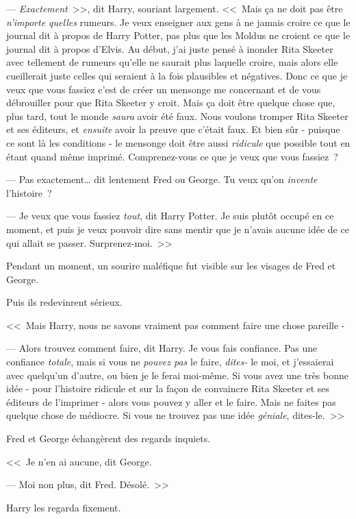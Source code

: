 --- \emph{Exactement}~>>, dit Harry, souriant largement. <<~Mais ça ne doit pas être \emph{n'importe quelles} rumeurs. Je veux enseigner aux gens à ne jamais croire ce que le journal dit à propos de Harry Potter, pas plus que les Moldus ne croient ce que le journal dit à propos d'Elvis. Au début, j'ai juste pensé à inonder Rita Skeeter avec tellement de rumeurs qu'elle ne saurait plus laquelle croire, mais alors elle cueillerait juste celles qui seraient à la fois plausibles et négatives. Donc ce que je veux que vous fassiez c'est de créer un mensonge me concernant et de vous débrouiller pour que Rita Skeeter y croit. Mais ça doit être quelque chose que, plus tard, tout le monde \emph{saura} avoir été faux. Nous voulons tromper Rita Skeeter et ses éditeurs, et \emph{ensuite} avoir la preuve que c'était faux. Et bien sûr - puisque ce sont là les conditions - le mensonge doit être aussi \emph{ridicule} que possible tout en étant quand même imprimé. Comprenez-vous ce que je veux que vous fassiez~?

--- Pas exactement… dit lentement Fred ou George. Tu veux qu'on \emph{invente} l'histoire~?

--- Je veux que vous fassiez \emph{tout}, dit Harry Potter. Je suis plutôt occupé en ce moment, et puis je veux pouvoir dire sans mentir que je n'avais aucune idée de ce qui allait se passer. Surprenez-moi.~>>

Pendant un moment, un sourire maléfique fut visible sur les visages de Fred et George.

Puis ils redevinrent sérieux.

<<~Mais Harry, nous ne savons vraiment pas comment faire une chose pareille -

--- Alors trouvez comment faire, dit Harry. Je vous fais confiance. Pas une confiance \emph{totale}, mais si vous ne \emph{pouvez pas} le faire, \emph{dites-} le moi, et j'essaierai avec quelqu'un d'autre, ou bien je le ferai moi-même. Si vous avez une très bonne idée - pour l'histoire ridicule et sur la façon de convaincre Rita Skeeter et ses éditeurs de l'imprimer - alors vous pouvez y aller et le faire. Mais ne faites pas quelque chose de médiocre. Si vous ne trouvez pas une idée \emph{géniale}, dites-le.~>>

Fred et George échangèrent des regards inquiets.

<<~Je n'en ai aucune, dit George.

--- Moi non plus, dit Fred. Désolé.~>>

Harry les regarda fixement.

